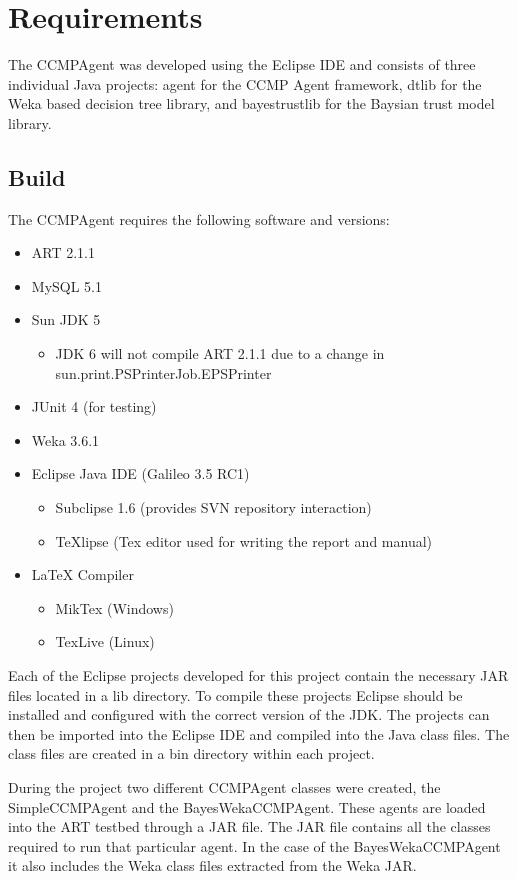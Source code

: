 \section{Requirements}
The CCMPAgent was developed using the Eclipse IDE and consists of three
individual Java projects: agent for the CCMP Agent framework, dtlib for the
Weka based decision tree library, and bayestrustlib for the Baysian trust model
library.

\subsection{Build}
The CCMPAgent requires the following software and versions: 
\begin{itemize}
  \item ART 2.1.1
  \item MySQL 5.1
  \item Sun JDK 5
  \begin{itemize}
    \item JDK 6 will not compile ART 2.1.1 due to a change in
sun.print.PSPrinterJob.EPSPrinter
  \end{itemize}
  \item JUnit 4 (for testing)
  \item Weka 3.6.1
  \item Eclipse Java IDE (Galileo 3.5 RC1)
  \begin{itemize}
    \item Subclipse 1.6 (provides SVN repository interaction)
    \item TeXlipse (Tex editor used for writing the report and manual)
  \end{itemize}
  \item LaTeX Compiler
  \begin{itemize}
    \item MikTex (Windows)
    \item TexLive (Linux)
  \end{itemize}
\end{itemize}

Each of the Eclipse projects developed for this project contain the necessary
JAR files located in a lib directory.  To compile these projects Eclipse should
be installed and configured with the correct version of the JDK.  The projects
can then be imported into the Eclipse IDE and compiled into the Java class
files.  The class files are created in a bin directory within each project.

During the project two different CCMPAgent classes were created, the
SimpleCCMPAgent and the BayesWekaCCMPAgent.  These agents are loaded into the
ART testbed through a JAR file.  The JAR file contains all the classes required
to run that particular agent.  In the case of the BayesWekaCCMPAgent it also
includes the Weka class files extracted from the Weka JAR.


